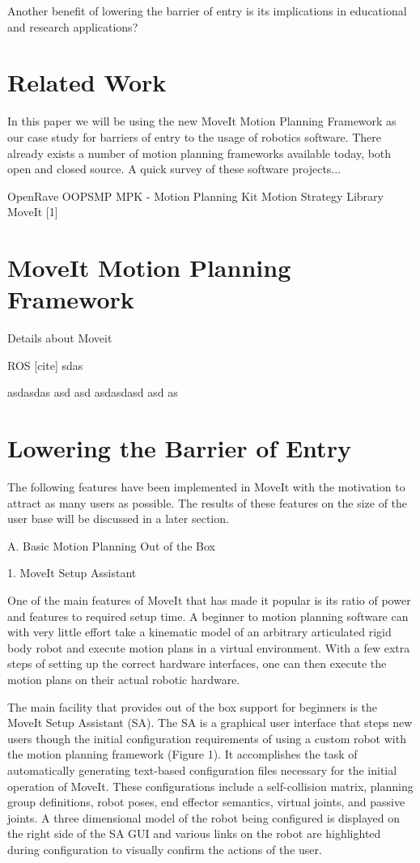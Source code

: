 \documentclass[10pt,journal,compsoc]{joser1}
\begin{document}
{Another benefit of lowering the barrier of entry is its implications in educational and research applications?

\section{Related Work}

In this paper we will be using the new MoveIt Motion Planning Framework as our case study for barriers of entry to the usage of robotics software. There already exists a number of motion planning frameworks available today, both open and closed source. A quick survey of these software projects...

OpenRave
OOPSMP
MPK - Motion Planning Kit
Motion Strategy Library
MoveIt [1]

\section{MoveIt Motion Planning Framework}

Details about Moveit

ROS [cite] sdas

asdasdas asd asd asdasdasd asd as

\section{Lowering the Barrier of Entry}

The following features have been implemented in MoveIt with the motivation to attract as many users as possible. The results of these features on the size of the user base will be discussed in a later section.

A. Basic Motion Planning Out of the Box

1. MoveIt Setup Assistant

One of the main features of MoveIt that has made it popular is its ratio of power and features to required setup time. A beginner to motion planning software can with very little effort take a kinematic model of an arbitrary articulated rigid body robot and execute motion plans in a virtual environment. With a few extra steps of setting up the correct hardware interfaces, one can then execute the motion plans on their actual robotic hardware.

The main facility that provides out of the box support for beginners is the MoveIt Setup Assistant (SA). The SA is a graphical user interface that steps new users though the initial configuration requirements of using a custom robot with the motion planning framework (Figure 1). It accomplishes the task of automatically generating text-based configuration files necessary for the initial operation of MoveIt. These configurations include a self-collision matrix, planning group definitions, robot poses, end effector semantics, virtual joints, and passive joints. A three dimensional model of the robot being configured is displayed on the right side of the SA GUI and various links on the robot are highlighted during configuration to visually confirm the actions of the user.

}
\end{document}
